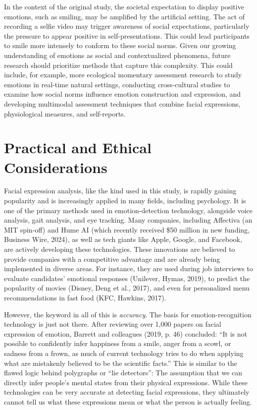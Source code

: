 \documentclass[authordate, empirical]{jote-new-article}
\begin{document}
	In the context of the original study, the societal expectation to display positive emotions, such as smiling, may be amplified by the artificial setting. The act of recording a selfie video may trigger awareness of social expectations, particularly the pressure to appear positive in self-presentations. This could lead participants to smile more intensely to conform to these social norms. Given our growing understanding of emotions as social and contextualized phenomena, future research should prioritize methods that capture this complexity. This could include, for example, more ecological momentary assessment research to study emotions in real-time natural settings, conducting cross-cultural studies to examine how social norms influence emotion construction and expression, and developing multimodal assessment techniques that combine facial expressions, physiological measures, and self-reports.







	\section{Practical and Ethical Considerations}



	Facial expression analysis, like the kind used in this study, is rapidly gaining popularity and is increasingly applied in many fields, including psychology. It is one of the primary methods used in emotion-detection technology, alongside voice analysis, gait analysis, and eye tracking. Many companies, including Affectiva (an MIT spin-off) and Hume AI (which recently received \$50 million in new funding, Business Wire, 2024), as well as tech giants like Apple, Google, and Facebook, are actively developing these technologies. These innovations are believed to provide companies with a competitive advantage and are already being implemented in diverse areas. For instance, they are used during job interviews to evaluate candidates' emotional responses (Unilever, Hymas, 2019), to predict the popularity of movies (Disney, Deng et al., 2017), and even for personalized menu recommendations in fast food (KFC, Hawkins, 2017).



	However, the keyword in all of this is \emph{accuracy}. The basis for emotion-recognition technology is just not there. After reviewing over 1,000 papers on facial expression of emotion, Barrett and colleagues (2019, p. 46) concluded: “It is not possible to confidently infer happiness from a smile, anger from a scowl, or sadness from a frown, as much of current technology tries to do when applying what are mistakenly believed to be the scientific facts.” This is similar to the flawed logic behind polygraphs or “lie detectors”: The assumption that we can directly infer people's mental states from their physical expressions. While these technologies can be very accurate at detecting facial expressions, they ultimately cannot tell us what these expressions mean or what the person is actually feeling.
\end{document}

